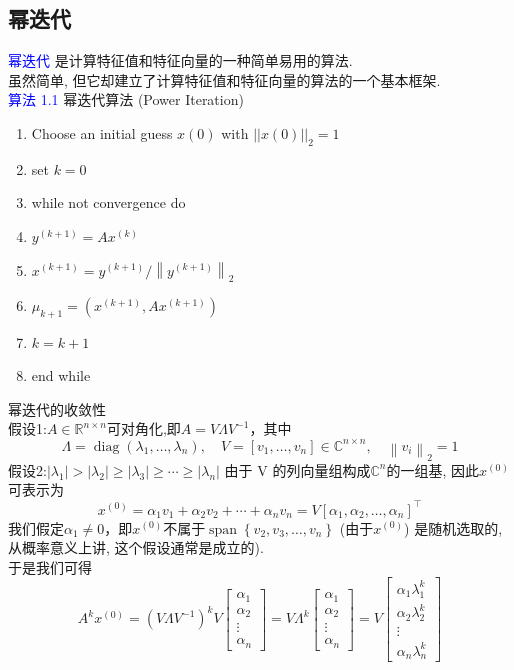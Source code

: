 \documentclass[12pt,a4paper]{article}
\begin{document}
\subsection{幂迭代}
\textcolor{blue}{幂迭代} 是计算特征值和特征向量的一种简单易用的算法.\\
虽然简单, 但它却建立了计算特征值和特征向量的算法的一个基本框架.\\
\textcolor{blue}{算法 1.1} 幂迭代算法 (Power Iteration)
\begin{enumerate}[1:]
	\item Choose an initial guess $x(0)$ with $||x(0)||_{2} = 1$
	\item set $k=0$
	\item while not convergence do
	\item \qquad$y^{(k+1)} = Ax^{(k)}$
	\item \qquad$x^{(k+1)}=y^{(k+1)} /\left\|y^{(k+1)}\right\|_{2}$
	\item \qquad$\mu_{k+1}=\left(x^{(k+1)}, A x^{(k+1)}\right)$
	\item \qquad$k=k+1$
	\item end while
\end{enumerate}
幂迭代的收敛性\\
假设1:$A \in \mathbb{R}^{n \times n}$可对角化,即$A=V \Lambda V^{-1}$，其中
$$
\Lambda=\operatorname{diag}\left(\lambda_{1}, \ldots, \lambda_{n}\right), \quad V=\left[v_{1}, \ldots, v_{n}\right] \in \mathbb{C}^{n \times n}, \quad\left\|v_{i}\right\|_{2}=1
$$
假设2:$\left|\lambda_{1}\right|>\left|\lambda_{2}\right| \geq\left|\lambda_{3}\right| \geq \cdots \geq\left|\lambda_{n}\right|$
由于 V 的列向量组构成$\mathbb{C}^{n}$的一组基, 因此$x^{(0)}$可表示为
$$
x^{(0)}=\alpha_{1} v_{1}+\alpha_{2} v_{2}+\cdots+\alpha_{n} v_{n}=V\left[\alpha_{1}, \alpha_{2}, \ldots, \alpha_{n}\right]^{\top}
$$
我们假定$\alpha_{1} \neq 0$，即$x^{(0)}$不属于$\operatorname{span}\left\{v_{2}, v_{3}, \ldots, v_{n}\right\}$
(由于$x^{(0)}$) 是随机选取的, 从概率意义上讲, 这个假设通常是成立的).\\
于是我们可得
$$
A^{k} x^{(0)}=\left(V \Lambda V^{-1}\right)^{k} V\left[\begin{array}{c}{\alpha_{1}} \\ {\alpha_{2}} \\ {\vdots} \\ {\alpha_{n}}\end{array}\right]=V \Lambda^{k}\left[\begin{array}{c}{\alpha_{1}} \\ {\alpha_{2}} \\ {\vdots} \\ {\alpha_{n}}\end{array}\right]=V\left[\begin{array}{c}{\alpha_{1} \lambda_{1}^{k}} \\ {\alpha_{2} \lambda_{2}^{k}} \\ {\vdots} \\ {\alpha_{n} \lambda_{n}^{k}}\end{array}\right]
$$
\end{document}
